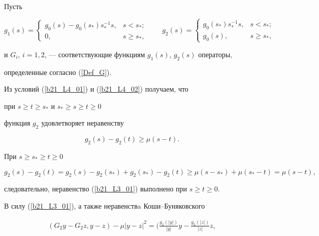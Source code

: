 \begin{pf}


Пусть


$$


g_1(s)=\begin{cases}


{g_0(s)- g_0(s_*)s_*^{-1} s,} & {s < s_*;} \\


{0,} & {s \geq s_*},


\end{cases}


\qquad g_2(s)=\begin{cases}


{g_0(s_*)s_*^{-1} s,} & {s < s_*;} \\


{g_0(s),} & {s \geq s_*},


\end{cases}


$$


и $G_i$, $i=1,2$, --- соответствующие функциям $g_1(s)$, $g_2(s)$ операторы,


определенные согласно (\ref{Def_G}).


Из условий (\ref{b21_L4_01}) и (\ref{b21_L4_02}) получаем, что


при $s \geq t \geq s_*$ и $s_* \geq s \geq t \geq 0$


функция $g_2$ удовлетворяет неравенству


\begin{equation}


g_2(s) -g_2(t) \geq \mu (s -t).


\label{b21_L3_01}


\end{equation}


При $s \geq s_* \geq t \geq 0$


$$


g_2(s) -g_2(t) = g_2(s) -g_2(s_*) + g_2(s_*) -g_2(t) \geq


\mu (s -s_*) + \mu (s_* -t)=\mu (s -t),


$$


следовательно, неравенство (\ref{b21_L3_01}) выполнено при $s\ge t \ge0$.


В силу (\ref{b21_L3_01}), а также неравенствa Коши--Буняковского


\begin{gather*}


(G_2 y -G_2 z, y -z)- \mu|y -z|^2 =


\bigg(\frac{g_2(|y|)}{|y|} y -\frac{g_2(|z|)}{|z|} z,



\end{gather*}
\end{pf}
